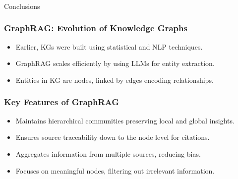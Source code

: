 




\begin{frame}[fragile]\frametitle{}
\begin{center}
{\Large Conclusions}

\end{center}
\end{frame}

\begin{frame}[fragile]\frametitle{GraphRAG: Evolution of Knowledge Graphs}
    \begin{itemize}
        \item Earlier, KGs were built using statistical and NLP techniques.
        \item GraphRAG scales efficiently by using LLMs for entity extraction.
        \item Entities in KG are nodes, linked by edges encoding relationships.
    \end{itemize}
\end{frame}

\begin{frame}[fragile]\frametitle{Key Features of GraphRAG}
    \begin{itemize}
        \item Maintains hierarchical communities preserving local and global insights.
        \item Ensures source traceability down to the node level for citations.
        \item Aggregates information from multiple sources, reducing bias.
        \item Focuses on meaningful nodes, filtering out irrelevant information.
    \end{itemize}
\end{frame}

